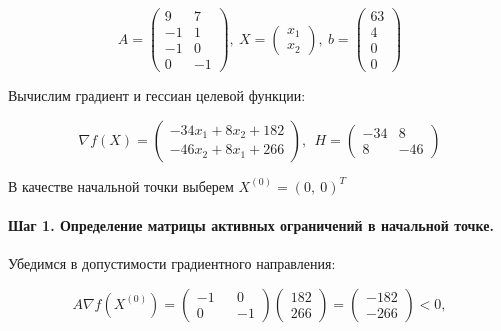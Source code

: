 \begin{equation*}
	A = \begin{pmatrix}
		9 & 7
		\\
		-1 & 1
		\\
		-1 & 0
		\\
		0 & -1
	\end{pmatrix}
	,\ %
	X = \begin{pmatrix}
	x_1 \\ x_2
	\end{pmatrix}
	,\ %
	b = \begin{pmatrix}
		63 \\ 4 \\ 0 \\ 0
	\end{pmatrix}
\end{equation*}

Вычислим градиент и гессиан целевой функции:

\begin{equation*}
	\nabla f(X) = \begin{pmatrix}
		-34 x_1 + 8 x_2 + 182
		\\
		-46 x_2 + 8 x_1 + 266
	\end{pmatrix}%
	,\ \ %
	H = \begin{pmatrix}
		-34 & 8
		\\
		8 & -46	
	\end{pmatrix}
\end{equation*}

В качестве начальной точки выберем $X^{(0)} = (0,\ 0)^T$

\paragraph{Шаг 1. Определение матрицы активных ограничений в начальной точке.}

Убедимся в допустимости градиентного направления:

\begin{equation*}
	A \nabla f(X^{(0)}) = \begin{pmatrix}
	-1 && 0 \\ 0 && -1
	\end{pmatrix}
	\begin{pmatrix}
	182 \\ 266
	\end{pmatrix}
	=
	\begin{pmatrix}
	-182 \\ -266
	\end{pmatrix}
	< 0,
\end{equation*}

